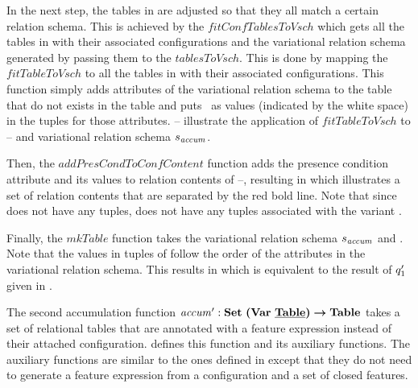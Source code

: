 \begin{example}
%
In the next step, the tables in  are adjusted so that they all match a certain
relation schema. This is achieved by the $\mathit{fitConfTablesToVsch}$ which gets all the 
tables in  with their associated configurations and the variational relation
schema generated by passing them to the $\mathit{tablesToVsch}$. This is done by
mapping the  $\mathit{fitTableToVsch}$ to all the tables in 
 with their associated configurations. This function simply adds
 attributes of the variational relation schema to the table that do not exists in the table 
 and puts \nul\ as values (indicated by the white space) in the tuples for those attributes. 
%
-- illustrate the application of 
$\mathit{fitTableToVsch}$ to -- and variational relation 
schema $\vRelSch_{\mathit{accum}}$.
%



%
Then, the $\mathit{addPresCondToConfContent}$ 
function adds the presence condition attribute and its values 
to relation contents of --, resulting in  which illustrates a set of 
relation contents that are separated by the red bold line. Note that since 
does not have any tuples,  does not have any tuples associated with
the variant \setDef \vThree.
%

%
Finally, the $\mathit{mkTable}$ function takes the variational relation schema $\vRelSch_{\mathit{accum}}$
and . Note that the values in tuples of  follow the order of the
attributes in the variational relation schema. This results in  which is equivalent to
the result of $\VVal \vQ_1$ given in .
%

\end{example}

The second accumulation function
 $\VVal {\mathit{accum}} :  \settype {\bm{(}\vartype \pTabSet\bm{)}} \totype \tabletype$ 
 takes a set of relational tables that are annotated with
a feature expression instead of their attached configuration.  defines
this function and its auxiliary functions. The auxiliary functions are similar to the ones
defined in  except that they do not need to generate a feature expression
from a configuration and a set of closed features.
%



